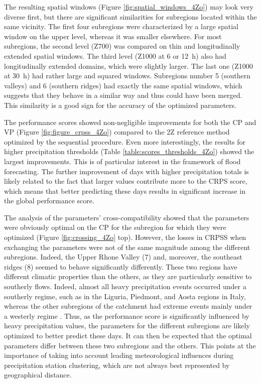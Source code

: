 \documentclass[review]{elsarticle}
\begin{document}
The resulting spatial windows (Figure \ref{fig:spatial_windows_4Zo}) may look very diverse first, but there are significant similarities for subregions located within the same vicinity. The first four subregions were characterized by a large spatial window on the upper level, whereas it was smaller elsewhere. For most subregions, the second level (Z700) was compared on thin and longitudinally extended spatial windows. The third level (Z1000 at 6 or 12~h) also had longitudinally extended domains, which were slightly larger. The last one (Z1000 at 30~h) had rather large and squared windows. Subregions number 5 (southern valleys) and 6 (southern ridges) had exactly the same spatial windows, which suggests that they behave in a similar way and thus could have been merged. This similarity is a good sign for the accuracy of the optimized parameters.

The performance scores showed non-negligible improvements for both the CP and VP (Figure \ref{fig:figure_crpss_4Zo}) compared to the 2Z reference method optimized by the sequential procedure. Even more interestingly, the results for higher precipitation thresholds (Table \ref{table:scores_thresholds_4Zo}) showed the largest improvements. This is of particular interest in the framework of flood forecasting. The further improvement of days with higher precipitation totals is likely related to the fact that larger values contribute more to the CRPS score, which means that better predicting these days results in significant increase in the global performance score.

The analysis of the parameters’ cross-compatibility showed that the parameters were obviously optimal on the CP for the subregion for which they were optimized (Figure \ref{fig:crossing_4Zo} top). However, the losses in CRPSS when exchanging the parameters were not of the same magnitude among the different subregions. Indeed, the Upper Rhone Valley (7) and, moreover, the southeast ridges (8) seemed to behave significantly differently. These two regions have different climatic properties than the others, as they are particularly sensitive to southerly flows. Indeed, almost all heavy precipitation events occurred under a southerly regime, such as in the Liguria, Piedmont, and Aosta regions in Italy, whereas the other subregions of the catchment had extreme events mainly under a westerly regime \citep{Horton2012}. Thus, as the performance score is significantly influenced by heavy precipitation values, the parameters for the different subregions are likely optimized to better predict these days. It can then be expected that the optimal parameters differ between these two subregions and the others. This points at the importance of taking into account leading meteorological influences during precipitation station clustering, which are not always best represented by geographical distance. 
\end{document}
